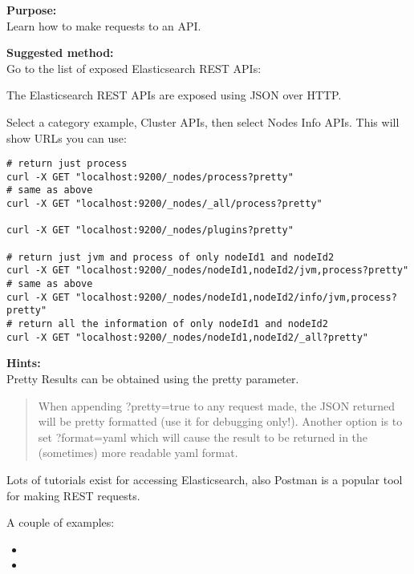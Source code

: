 \documentclass[a4paper,11pt,notitlepage]{report}
\begin{document}
{\bf Purpose:}\\
Learn how to make requests to an API.

{\bf Suggested method:}\\
Go to the list of exposed Elasticsearch REST APIs:\\

The Elasticsearch REST APIs are exposed using JSON over HTTP.

Select a category example, Cluster APIs, then select Nodes Info APIs. This will show URLs you can use:

\begin{verbatim}
# return just process
curl -X GET "localhost:9200/_nodes/process?pretty"
# same as above
curl -X GET "localhost:9200/_nodes/_all/process?pretty"

curl -X GET "localhost:9200/_nodes/plugins?pretty"

# return just jvm and process of only nodeId1 and nodeId2
curl -X GET "localhost:9200/_nodes/nodeId1,nodeId2/jvm,process?pretty"
# same as above
curl -X GET "localhost:9200/_nodes/nodeId1,nodeId2/info/jvm,process?pretty"
# return all the information of only nodeId1 and nodeId2
curl -X GET "localhost:9200/_nodes/nodeId1,nodeId2/_all?pretty"
\end{verbatim}


{\bf Hints:}\\
Pretty Results can be obtained using the pretty parameter.
\begin{quote}
When appending ?pretty=true to any request made, the JSON returned will be pretty formatted (use it for debugging only!). Another option is to set ?format=yaml which will cause the result to be returned in the (sometimes) more readable yaml format.
\end{quote}

Lots of tutorials exist for accessing Elasticsearch, also Postman is a popular tool for making REST requests.

A couple of examples:
\begin{itemize}
\item {}
\item {}
\end{itemize}
\end{document}
